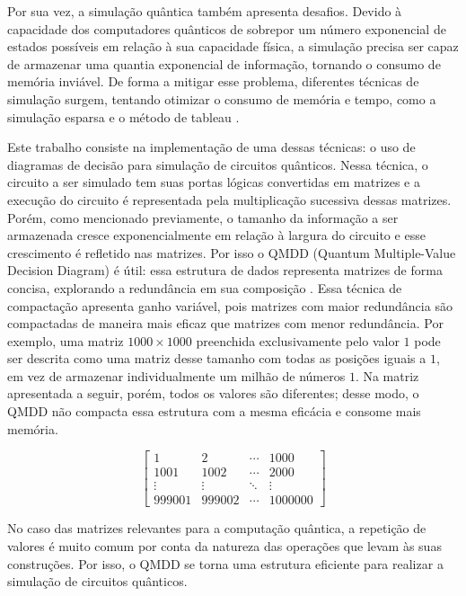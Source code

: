 Por sua vez, a simulação quântica também apresenta desafios. Devido à capacidade dos computadores quânticos de sobrepor um número exponencial de estados possíveis em relação à sua capacidade física, a simulação precisa ser capaz de armazenar uma quantia exponencial de informação, tornando o consumo de memória inviável. De forma a mitigar esse problema, diferentes técnicas de simulação surgem, tentando otimizar o consumo de memória e tempo, como a simulação esparsa \cite{jaques2022leveraging} e o método de tableau \cite{aaronson2004improved}.

Este trabalho consiste na implementação de uma dessas técnicas: o uso de diagramas de decisão para simulação de circuitos quânticos. Nessa técnica, o circuito a ser simulado tem suas portas lógicas convertidas em matrizes e a execução do circuito é representada pela multiplicação sucessiva dessas matrizes. Porém, como mencionado previamente, o tamanho da informação a ser armazenada cresce exponencialmente em relação à largura do circuito e esse crescimento é refletido nas matrizes. Por isso o QMDD (Quantum Multiple-Value Decision Diagram) é útil: essa estrutura de dados representa matrizes de forma concisa, explorando a redundância em sua composição \cite{fujita1997multi}. Essa técnica de compactação apresenta ganho variável, pois matrizes com maior redundância são compactadas de maneira mais eficaz que matrizes com menor redundância. Por exemplo, uma matriz $1000 \times 1000$ preenchida exclusivamente pelo valor $1$ pode ser descrita como uma matriz desse tamanho com todas as posições iguais a $1$, em vez de armazenar individualmente um milhão de números $1$. Na matriz apresentada a seguir, porém, todos os valores são diferentes; desse modo, o QMDD não compacta essa estrutura com a mesma eficácia e consome mais memória.

\begin{equation}
  \label{distinctmatrix}
  \begin{bmatrix}
    1 & 2 & \cdots & 1000 \\
    1001 & 1002 & \cdots & 2000 \\
    \vdots & \vdots & \ddots & \vdots \\
    999001 & 999002 & \cdots & 1000000
  \end{bmatrix}
\end{equation}

No caso das matrizes relevantes para a computação quântica, a repetição de valores é muito comum por conta da natureza das operações que levam às suas construções. Por isso, o QMDD se torna uma estrutura eficiente para realizar a simulação de circuitos quânticos. 

